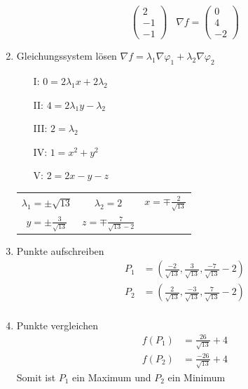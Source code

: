 \documentclass[8pt, a4paper, landscape, fleqn]{scrartcl}
\newenvironment {example}
				{\begin{itshape} \begin{small}}
				{\end{small} \end{itshape}}
\begin{document}
\begin{multicols*}{3}
\begin{example}
\begin{enumerate}
\begin{equation*}
								\begin{pmatrix}
									2\\ -1\\-1
								\end{pmatrix}
								\hspace{10pt} \nabla f=
								\begin{pmatrix}
									0\\ 4\\ -2
								\end{pmatrix}
							\end{equation*}
							\item Gleichungssystem lösen \hspace{10pt} $\nabla f=\lambda_1 \nabla \varphi_1+\lambda_2 \nabla \varphi_2$
							\begin{multicols*}{2}
								\begin{itemize}
									\item[I: ] $0 =2 \lambda_1 x+2 \lambda_2$
									\item[II: ] $4=2 \lambda_1 y-\lambda_2$
									\item[III: ] $2=\lambda_2$
									\item[IV: ] $1=x^2+y^2$
									\item[V: ] $2=2x-y-z$
								\end{itemize}
							\end{multicols*}
							\begin{tabular}{ccc}
								$\lambda_1=\pm \sqrt{13}$ &$\lambda_2 =2$ &$x=\mp \frac{2}{\sqrt{13}}$\\
								$y=\pm \frac{3}{\sqrt{13}}$ &$z=\mp \frac{7}{\sqrt{13}-2}$ &\\
							\end{tabular}
							\item Punkte aufschreiben
							\begin{align*}
								P_1&=\left(\frac{-2}{\sqrt{13}}, \frac{3}{\sqrt{13}}, \frac{-7}{\sqrt{13}}-2 \right)\\
								P_2&=\left(\frac{2}{\sqrt{13}}, \frac{-3}{\sqrt{13}}, \frac{7}{\sqrt{13}}-2 \right)\\
							\end{align*}
							\item Punkte vergleichen
							\begin{align*}
								f(P_1)&=\frac{26}{\sqrt{13}}+4\\
								f(P_2)&=\frac{-26}{\sqrt{13}}+4
							\end{align*}
							Somit ist $P_1$ ein Maximum und $P_2$ ein Minimum

\end{enumerate}
\end{example}
\end{multicols*}
\end{document}
